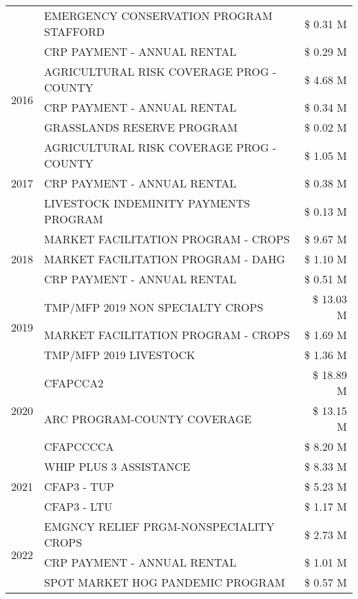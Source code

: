 \begin{tabular}{llr}
 & EMERGENCY CONSERVATION PROGRAM STAFFORD & \$ 0.31 M \\
 & CRP PAYMENT - ANNUAL RENTAL & \$ 0.29 M \\
\cline{1-3}
\multirow[t]{3}{*}{2016} & AGRICULTURAL RISK COVERAGE PROG - COUNTY & \$ 4.68 M \\
 & CRP PAYMENT - ANNUAL RENTAL & \$ 0.34 M \\
 & GRASSLANDS RESERVE PROGRAM & \$ 0.02 M \\
\cline{1-3}
\multirow[t]{3}{*}{2017} & AGRICULTURAL RISK COVERAGE PROG - COUNTY & \$ 1.05 M \\
 & CRP PAYMENT - ANNUAL RENTAL & \$ 0.38 M \\
 & LIVESTOCK INDEMINITY PAYMENTS PROGRAM & \$ 0.13 M \\
\cline{1-3}
\multirow[t]{3}{*}{2018} & MARKET FACILITATION PROGRAM - CROPS & \$ 9.67 M \\
 & MARKET FACILITATION PROGRAM - DAHG & \$ 1.10 M \\
 & CRP PAYMENT - ANNUAL RENTAL & \$ 0.51 M \\
\cline{1-3}
\multirow[t]{3}{*}{2019} & TMP/MFP 2019 NON SPECIALTY CROPS & \$ 13.03 M \\
 & MARKET FACILITATION PROGRAM - CROPS & \$ 1.69 M \\
 & TMP/MFP 2019 LIVESTOCK & \$ 1.36 M \\
\cline{1-3}
\multirow[t]{3}{*}{2020} & CFAPCCA2 & \$ 18.89 M \\
 & ARC PROGRAM-COUNTY COVERAGE & \$ 13.15 M \\
 & CFAPCCCCA & \$ 8.20 M \\
\cline{1-3}
\multirow[t]{3}{*}{2021} & WHIP PLUS 3 ASSISTANCE & \$ 8.33 M \\
 & CFAP3 - TUP & \$ 5.23 M \\
 & CFAP3 - LTU & \$ 1.17 M \\
\cline{1-3}
\multirow[t]{3}{*}{2022} & EMGNCY RELIEF PRGM-NONSPECIALITY CROPS & \$ 2.73 M \\
 & CRP PAYMENT - ANNUAL RENTAL & \$ 1.01 M \\
 & SPOT MARKET HOG PANDEMIC PROGRAM & \$ 0.57 M \\
\cline{1-3}
\bottomrule
\end{tabular}
